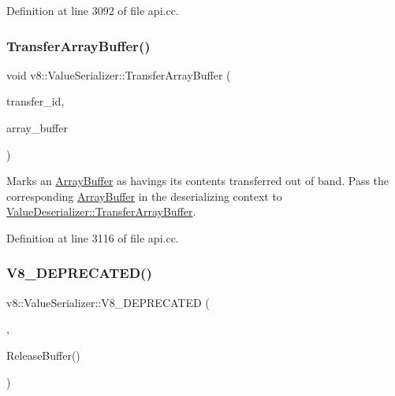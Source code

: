 Definition at line 3092 of file api.\+cc.

\mbox{\label{classv8_1_1ValueSerializer_a27007f2530a496275ccf7b8846f1d9c5}} 
\subsubsection{\texorpdfstring{Transfer\+Array\+Buffer()}{TransferArrayBuffer()}}
{\footnotesize\ttfamily void v8\+::\+Value\+Serializer\+::\+Transfer\+Array\+Buffer (\begin{DoxyParamCaption}\item[{\mbox{\hyperlink{classuint32__t}{uint32\+\_\+t}}}]{transfer\+\_\+id,  }\item[{\mbox{\hyperlink{classv8_1_1Local}{Local}}$<$ \mbox{\hyperlink{classv8_1_1ArrayBuffer}{Array\+Buffer}} $>$}]{array\+\_\+buffer }\end{DoxyParamCaption})}

Marks an \mbox{\hyperlink{classv8_1_1ArrayBuffer}{Array\+Buffer}} as havings its contents transferred out of band. Pass the corresponding \mbox{\hyperlink{classv8_1_1ArrayBuffer}{Array\+Buffer}} in the deserializing context to \mbox{\hyperlink{classv8_1_1ValueDeserializer_a853acc2c7b30571d6719ddd92a48da3b}{Value\+Deserializer\+::\+Transfer\+Array\+Buffer}}. 

Definition at line 3116 of file api.\+cc.

\mbox{\label{classv8_1_1ValueSerializer_a64a2c151142bc706a446d15599541ca4}} 
\subsubsection{\texorpdfstring{V8\+\_\+\+D\+E\+P\+R\+E\+C\+A\+T\+E\+D()}{V8\_DEPRECATED()}\hspace{0.1cm}{\footnotesize\ttfamily [1/2]}}
{\footnotesize\ttfamily v8\+::\+Value\+Serializer\+::\+V8\+\_\+\+D\+E\+P\+R\+E\+C\+A\+T\+ED (\begin{DoxyParamCaption}\item[{\char`\"{}Use \mbox{\hyperlink{classv8_1_1ValueSerializer_a5e15aee37a321fd0dc3e92dd87e1334f}{Release}}()\char`\"{}}]{,  }\item[{std\+::vector$<$ uint8\+\_\+t $>$ }]{Release\+Buffer() }\end{DoxyParamCaption})}

